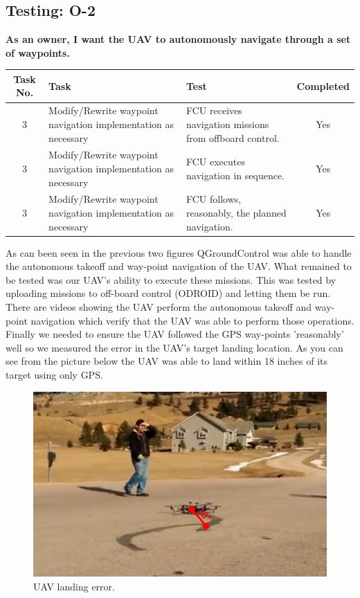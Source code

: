 \newpage
\subsection{Testing: O-2}
\textbf{As an owner, I want the UAV to autonomously navigate through a set of waypoints.}\\
\begin{tabular}{| c | >{\raggedright}m{4cm} | m{4cm} | c |}\hline
	Task No. & Task & Test & Completed\\\hline
	3 & Modify/Rewrite waypoint navigation implementation as necessary & FCU receives navigation missions from offboard control. & Yes\\\hline
	3 & Modify/Rewrite waypoint navigation implementation as necessary & FCU executes navigation in sequence. & Yes\\\hline
	3 & Modify/Rewrite waypoint navigation implementation as necessary & FCU follows, reasonably, the planned navigation. & Yes\\\hline
\end{tabular}
\vfill
As can been seen in the previous two figures QGroundControl was able to handle the autonomous takeoff and way-point navigation of the UAV. What remained to be tested was our UAV's ability to execute these missions. This was tested by uploading missions to off-board control (ODROID) and letting them be run. There are videos showing the UAV perform the autonomous takeoff and way-point navigation which verify that the UAV was able to perform those operations. Finally we needed to ensure the UAV followed the GPS way-points 'reasonably' well so we measured the error in the UAV's target landing location. As you can see from the picture below the UAV was able to land within 18 inches of its target using only GPS.

\begin{figure}[H]
\centering
\includegraphics{images/UAVLanding}
\caption{UAV landing error.}
\end{figure}

